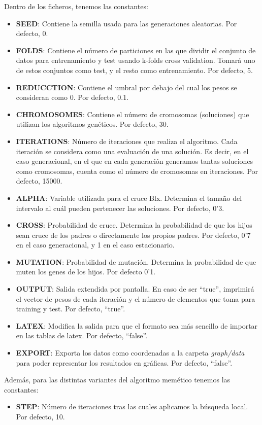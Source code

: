 \documentclass[11pt,a4paper]{article}
\begin{document}
Dentro de los ficheros, tenemos las constantes:
\begin{itemize}
\item \textbf{SEED}: Contiene la semilla usada para las generaciones aleatorias. Por defecto, 0.
\item \textbf{FOLDS}: Contiene el número de particiones en las que dividir el conjunto de datos para entrenamiento y test usando k-folds cross validation. Tomará uno de estos conjuntos como test, y el resto como entrenamiento. Por defecto, 5.
\item \textbf{REDUCCTION}: Contiene el umbral por debajo del cual los pesos se consideran como 0. Por defecto, 0.1.
\item \textbf{CHROMOSOMES}: Contiene el número de cromosomas (soluciones) que utilizan los algoritmos genéticos. Por defecto, 30.
\item \textbf{ITERATIONS}: Número de iteraciones que realiza el algoritmo. Cada iteración se considera como una evaluación de una solución. Es decir, en el caso generacional, en el que en cada generación generamos tantas soluciones como cromosomas, cuenta como el número de cromosomas en iteraciones. Por defecto, 15000.
\item \textbf{ALPHA}: Variable utilizada para el cruce Blx. Determina el tamaño del intervalo al cuál pueden pertenecer las soluciones. Por defecto, 0'3.
\item \textbf{CROSS}: Probabilidad de cruce. Determina la probabilidad de que los hijos sean cruce de los padres o directamente los propios padres. Por defecto, 0'7 en el caso generacional, y 1 en el caso estacionario.
\item \textbf{MUTATION}: Probabilidad de mutación. Determina la probabilidad de que muten los genes de los hijos. Por defecto 0'1.
\item \textbf{OUTPUT}: Salida extendida por pantalla. En caso de ser ``true'', imprimirá el vector de pesos de cada iteración y el número de elementos que toma para training y test. Por defecto, ``true''.
\item \textbf{LATEX}: Modifica la salida para que el formato sea más sencillo de importar en las tablas de latex. Por defecto, ``false''.
\item \textbf{EXPORT}: Exporta los datos como coordenadas a la carpeta \emph{graph/data} para poder representar los resultados en gráficas. Por defecto, ``false''.
\end{itemize}
Además, para las distintas variantes del algoritmo memético tenemos las constantes:
\begin{itemize}
\item \textbf{STEP}: Número de iteraciones tras las cuales aplicamos la búsqueda local. Por defecto, 10.
\end{itemize}
\end{document}
